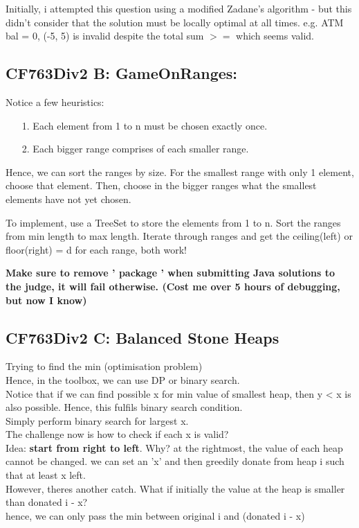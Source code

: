\documentclass[12pt]{article}
\begin{document}
{ Initially, i attempted this question using a modified Zadane's algorithm - but this didn't consider that the solution must be locally optimal at all times. 
 e.g. ATM bal = 0, (-5, 5) is invalid despite the total sum \(>=\) which seems valid. 
 
 \subsection{CF763Div2 B: GameOnRanges:}
 Notice a few heuristics: 
 \begin{itemize} 
 	\item[1.] Each element from 1 to n must be chosen exactly once. 
	\item[2.] Each bigger range comprises of each smaller range. 
 \end{itemize} 

Hence, we can sort the ranges by size. 
For the smallest range with only 1 element, choose that element. 
Then, choose in the bigger ranges what the smallest elements have not yet chosen. 

To implement, use a TreeSet to store the elements from 1 to n. 
Sort the ranges from min length to max length. 
Iterate through ranges and get the ceiling(left) or floor(right) = d for each range, both work! 

\textbf{Make sure to remove ' package ' when submitting Java solutions to the judge, it will fail otherwise. (Cost me over 5 hours of debugging, but now I know)} 

\subsection{CF763Div2 C: Balanced Stone Heaps} 
Trying to find the min (optimisation problem) \\
Hence, in the toolbox, we can use DP or binary search. \\ [\baselineskip] 

Notice that if we can find possible x for min value of smallest heap, then y < x is also possible. Hence, this fulfils binary search condition. \\
Simply perform binary search for largest x. \\ [\baselineskip]

The challenge now is how to check if each x is valid? \\
Idea: {\textbf{start from right to left}}. Why? at the rightmost, the value of each heap cannot be changed. we can set an 'x' and then greedily donate from heap i such that at least x left. \\
However, theres another catch. What if initially the value at the heap is smaller than donated i - x? \\ 
hence, we can only pass the min between original i and (donated i - x) \\ [\baselineskip]

}
\end{document}
